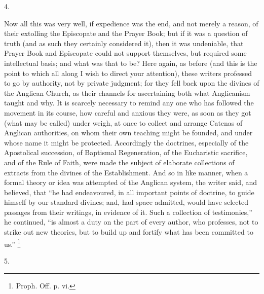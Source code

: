4.

Now all this was very well, if expedience was the end, and not
merely a reason, of their extolling the Episcopate and the Prayer
Book; but if it was a question of truth (and as such they certainly
considered it), then it was undeniable, that Prayer Book and
Episcopate could not support themselves, but required some
intellectual basis; and what was that to be? Here again, as before
(and this is the point to which all along I wish to direct your
attention), these writers professed to go by authority, not by private
judgment; for they fell back upon the divines of the Anglican Church,
as their channels for ascertaining both what Anglicanism taught and
why. It is scarcely necessary to remind any one who has followed the
movement in its course, how careful and anxious they were, as soon as
they got (what may be called) under weigh, at once to collect and
arrange Catenas of Anglican authorities, on whom their own teaching
might be founded, and under whose name it might be protected.
Accordingly the doctrines, especially of the Apostolical succession,
of Baptismal Regeneration, of the Eucharistic sacrifice, and of the
Rule of Faith, were made the subject of elaborate collections of
extracts from the divines of the Establishment. And so in like manner,
when a formal theory or idea was attempted of the Anglican system, the
writer said, and believed, that ``he had endeavoured, in all
important points of doctrine, to guide himself by our standard
divines; and, had space admitted, would have selected passages from
their writings, in evidence of it. Such a collection of
testimonies,'' he continued, ``is almost a duty on the part of
every author, who professes, not to strike out new theories, but to
build up and fortify what has been committed to us.'' \footnote{Proph. Off. p. vi.}

5.

